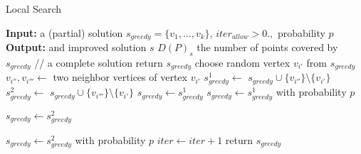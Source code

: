 \documentclass[runningheads,a4paper]{llncs}
\begin{document}
       \begin{algorithm}[!t]
      	\caption{Local Search}\label{alg:local-search}
      	\begin{algorithmic}[1]
      		\State \textbf{Input:} a (partial) solution $s_{greedy}=\{v_1,...,v_k\}$, $iter_{allow}>0., $ probability $p$
      		\State \textbf{Output:} and improved solution $s$
      		     \State $D(P)_s$ the number of points covered by $s_{greedy}$
      		       // a complete solution
      		          \State return $s_{greedy}$
      		      \EndIf
      		     \State choose random vertex $v_{i'}$ from $s_{greedy}$
      		     \State $v_{i''},v_{i'''} \gets$ two neighbor vertices of vertex  $v_{i'}$
      		     \State $s^1_{greedy} \gets$ $s_{greedy} \cup \{v_{i''} \} \setminus \{v_{i'}\}$
                 \State $s^2_{greedy} \gets$ $s_{greedy} \cup \{v_{i'''} \} \setminus \{v_{i'}\}$
                        \State $s_{greedy} \gets s^1_{greedy}$
      \EndIf
                        \State $s_{greedy} \gets s^1_{greedy}$ with probability $p$

      		      \EndIf
                        \State $s_{greedy} \gets s^2_{greedy}$
      		      \EndIf

                        \State $s_{greedy} \gets s^2_{greedy}$ with probability $p$
                    \EndIf
      		     \State $iter \gets iter +1 $
      		\EndWhile
      		 \State return $s_{greedy}$
      	\end{algorithmic}
      \end{algorithm}
    \begin{comment}
    
     \subsection{Beam Search (BS)}
        Beam Searxh is an incomplete BFS heuristic search algorithm. At each level of the search, the best $\beta>0$ nodes i kept in the structure called \emph{beam} $B$. all nodes are then expanded in all possible ways. Among the expansions, again, $\beta$ bst nodes is taken for the beam of the next level. 
        The search is processed in the same manner until $B$ is empty. The main question concerns of the criterion of choosing the nodes for a beam. This is done by means of a heuristic evaluation of the nodes. The heuristic is a problem-specific aspect of each problem that is considered for solving. \fxnote{work in progress...}
    \end{comment}   
    
\end{document}

